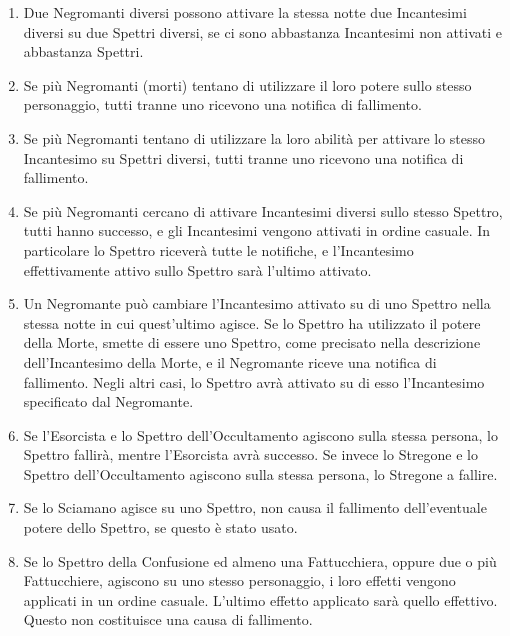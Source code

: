 \documentclass[a4paper,10pt]{article}
\begin{document}
\begin{enumerate}
	\item Due Negromanti diversi possono attivare la stessa notte due Incantesimi diversi su due Spettri diversi, se ci sono abbastanza Incantesimi non attivati e abbastanza Spettri.
	
	\item Se più Negromanti (morti) tentano di utilizzare il loro potere sullo stesso personaggio, tutti tranne uno ricevono una notifica di fallimento.
	
	\item Se più Negromanti tentano di utilizzare la loro abilità per attivare lo stesso Incantesimo su Spettri diversi, tutti tranne uno ricevono una notifica di fallimento.
	
	\item Se più Negromanti cercano di attivare Incantesimi diversi sullo stesso Spettro, tutti hanno successo, e gli Incantesimi vengono attivati in ordine casuale. In particolare lo Spettro riceverà tutte le notifiche, e l'Incantesimo effettivamente attivo sullo Spettro sarà l'ultimo attivato.
	
	\item Un Negromante può cambiare l'Incantesimo attivato su di uno Spettro nella stessa notte in cui quest'ultimo agisce. Se lo Spettro ha utilizzato il potere della Morte, smette di essere uno Spettro, come precisato nella descrizione dell'Incantesimo della Morte, e il Negromante riceve una notifica di fallimento. Negli altri casi, lo Spettro avrà attivato su di esso l'Incantesimo specificato dal Negromante.
	
	\item Se l'Esorcista e lo Spettro dell'Occultamento agiscono sulla stessa persona, lo Spettro fallirà, mentre l'Esorcista avrà successo. Se invece lo Stregone e lo Spettro dell'Occultamento agiscono sulla stessa persona, lo Stregone a fallire.
	
	\item Se lo Sciamano agisce su uno Spettro, non causa il fallimento dell'eventuale potere dello Spettro, se questo è stato usato.
	
	\item Se lo Spettro della Confusione ed almeno una Fattucchiera, oppure due o più Fattucchiere, agiscono su uno stesso personaggio, i loro effetti vengono applicati in un ordine casuale. L'ultimo effetto applicato sarà quello effettivo. Questo non costituisce una causa di fallimento.
	

\end{enumerate}
\end{document}
